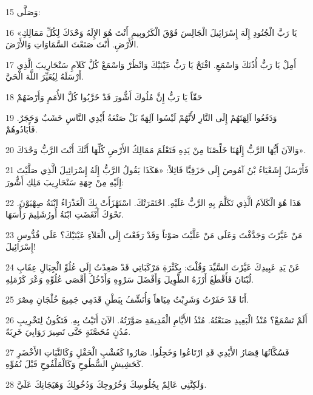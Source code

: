 \par 15 وَصَلَّى:
\par 16 «يَا رَبَّ الْجُنُودِ إِلَهَ إِسْرَائِيلَ الْجَالِسَ فَوْقَ الْكَرُوبِيمِ أَنْتَ هُوَ الإِلَهُ وَحْدَكَ لِكُلِّ مَمَالِكِ الأَرْضِ. أَنْتَ صَنَعْتَ السَّمَاوَاتِ وَالأَرْضَ.
\par 17 أَمِلْ يَا رَبُّ أُذُنَكَ وَاسْمَعِ. افْتَحْ يَا رَبُّ عَيْنَيْكَ وَانْظُرْ وَاسْمَعْ كُلَّ كَلاَمِ سَنْحَارِيبَ الَّذِي أَرْسَلَهُ لِيُعَيِّرَ اللَّهَ الْحَيَّ.
\par 18 حَقّاً يَا رَبُّ إِنَّ مُلُوكَ أَشُّورَ قَدْ خَرَّبُوا كُلَّ الأُمَمِ وَأَرْضَهُمْ
\par 19 وَدَفَعُوا آلِهَتَهُمْ إِلَى النَّارِ لأَنَّهُمْ لَيْسُوا آلِهَةً بَلْ صَنْعَةُ أَيْدِي النَّاسِ خَشَبٌ وَحَجَرٌ. فَأَبَادُوهُمْ.
\par 20 وَالآنَ أَيُّهَا الرَّبُّ إِلَهُنَا خَلِّصْنَا مِنْ يَدِهِ فَتَعْلَمَ مَمَالِكُ الأَرْضِ كُلِّهَا أَنَّكَ أَنْتَ الرَّبُّ وَحْدَكَ».
\par 21 فَأَرْسَلَ إِشَعْيَاءُ بْنُ آمُوصَ إِلَى حَزَقِيَّا قَائِلاً: «هَكَذَا يَقُولُ الرَّبُّ إِلَهُ إِسْرَائِيلَ الَّذِي صَلَّيْتَ إِلَيْهِ مِنْ جِهَةِ سَنْحَارِيبَ مَلِكِ أَشُّورَ:
\par 22 هَذَا هُوَ الْكَلاَمُ الَّذِي تَكَلَّمَ بِهِ الرَّبُّ عَلَيْهِ. احْتَقَرَتْكَ. اسْتَهْزَأَتْ بِكَ الْعَذْرَاءُ ابْنَةُ صِهْيَوْنَ. نَحْوَكَ أَنْغَضَتِ ابْنَةُ أُورُشَلِيمَ رَأْسَهَا.
\par 23 مَنْ عَيَّرْتَ وَجَدَّفْتَ وَعَلَى مَنْ عَلَّيْتَ صَوْتاً وَقَدْ رَفَعْتَ إِلَى الْعَلاَءِ عَيْنَيْكَ؟ عَلَى قُدُّوسِ إِسْرَائِيلَ!
\par 24 عَنْ يَدِ عَبِيدِكَ عَيَّرْتَ السَّيِّدَ وَقُلْتَ: بِكَثْرَةِ مَرْكَبَاتِي قَدْ صَعِدْتُ إِلَى عُلُوِّ الْجِبَالِ عِقَابِ لُبْنَانَ فَأَقْطَعُ أَرْزَهُ الطَّوِيلَ وَأَفْضَلَ سَرْوِهِ وَأَدْخُلُ أَقْصَى عُلُوِّهِ وَعْرَ كَرْمَلِهِ.
\par 25 أَنَا قَدْ حَفَرْتُ وَشَرِبْتُ مِيَاهاً وَأُنَشِّفُ بِبَطْنِ قَدَمِي جَمِيعَ خُلْجَانِ مِصْرَ.
\par 26 أَلَمْ تَسْمَعْ؟ مُنْذُ الْبَعِيدِ صَنَعْتُهُ. مُنْذُ الأَيَّامِ الْقَدِيمَةِ صَوَّرْتُهُ. الآنَ أَتَيْتُ بِهِ. فَتَكُونُ لِتَخْرِيبِ مُدُنٍ مُحَصَّنَةٍ حَتَّى تَصِيرَ رَوَابِيَ خَرِبَةً.
\par 27 فَسُكَّانُهَا قِصَارُ الأَيْدِي قَدِ ارْتَاعُوا وَخَجِلُوا. صَارُوا كَعُشْبِ الْحَقْلِ وَكَالنَّبَاتِ الأَخْضَرِ كَحَشِيشِ السُّطُوحِ وَكَالْمَلْفُوحِ قَبْلَ نُمُوِّهِ.
\par 28 وَلَكِنَّنِي عَالِمٌ بِجُلُوسِكَ وَخُرُوجِكَ وَدُخُولِكَ وَهَيَجَانِكَ عَلَيَّ.

